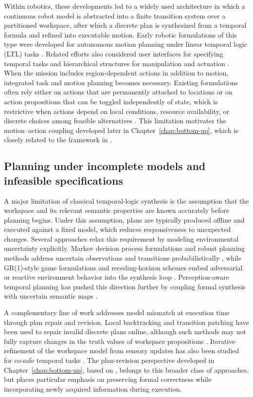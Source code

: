 Within robotics, these developments led to a widely used architecture in which a
continuous robot model is abstracted into a finite transition system over a
partitioned workspace, after which a discrete plan is synthesized from a temporal
formula and refined into executable motion. Early robotic formulations of this
type were developed for autonomous motion planning under linear temporal logic
(LTL) tasks \cite{fainekos2009temporal}. Related efforts also considered user
interfaces for specifying temporal tasks and hierarchical structures for
manipulation and actuation \cite{srinivas2013graphical,he2015towards}. When the
mission includes region-dependent actions in addition to motion, integrated task
and motion planning becomes necessary. Existing formulations often rely either on
actions that are permanently attached to locations or on action propositions that
can be toggled independently of state, which is restrictive when actions depend
on local conditions, resource availability, or discrete choices among feasible
alternatives \cite{smith2011optimal,kress2009temporal}. This limitation motivates
the motion--action coupling developed later in Chapter~\ref{chap:bottom-up},
which is closely related to the framework in \cite{guo2013motion}.

\subsection{Planning under incomplete models and infeasible specifications}

A major limitation of classical temporal-logic synthesis is the assumption that
the workspace and its relevant semantic properties are known accurately before
planning begins. Under this assumption, plans are typically produced offline and
executed against a fixed model, which reduces responsiveness to unexpected
changes. Several approaches relax this requirement by modeling environmental
uncertainty explicitly. Markov decision process formulations and robust planning
methods address uncertain observations and transitions probabilistically
\cite{ding2011mdp,wolff2012robust}, while GR(1)-style game formulations and
receding-horizon schemes embed adversarial or reactive environment behavior into
the synthesis loop \cite{kress2009temporal,wongpiromsarn2010receding}.
Perception-aware temporal planning has pushed this direction further by coupling
formal synthesis with uncertain semantic maps \cite{kantaros2022perception}.

A complementary line of work addresses model mismatch at execution time through
plan repair and revision. Local backtracking and transition patching have been
used to repair invalid discrete plans online, although such methods may not fully
capture changes in the truth values of workspace propositions
\cite{livingston2012backtracking}. Iterative refinement of the workspace model
from sensory updates has also been studied for co-safe temporal tasks
\cite{maly2013iterative}. The plan-revision perspective developed in
Chapter~\ref{chap:bottom-up}, based on \cite{guo2013revising}, belongs to this
broader class of approaches, but places particular emphasis on preserving formal
correctness while incorporating newly acquired information during execution.


